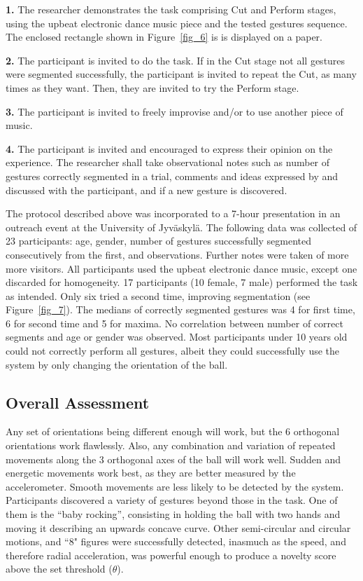 \documentclass{nime-alternate_ADJ} %
\begin{document}
\textbf{1.}	The researcher demonstrates the task comprising Cut and Perform stages, using the upbeat electronic dance music piece and the tested gestures sequence. The enclosed rectangle shown in Figure~\ref{fig_6} is is displayed on a paper.

\textbf{2.}	The participant is invited to do the task. If in the Cut stage not all gestures were segmented successfully, the participant is invited to repeat the Cut, as many times as they want. Then, they are invited to try the Perform stage.

\textbf{3.}	The participant is invited to freely improvise and/or to use another piece of music.

\textbf{4.}	The participant is invited and encouraged to express their opinion on the experience. The researcher shall take observational notes such as number of gestures correctly segmented in a trial, comments and ideas expressed by and discussed with the participant, and if a new gesture is discovered.

The protocol described above was incorporated to a 7-hour presentation in an outreach event at the 
University of Jyväskylä. The following data was collected of 23 participants: age, gender, number of gestures successfully segmented consecutively from the first, and observations. Further  notes were taken of more more visitors. All participants used the upbeat electronic dance music, except one  discarded for homogeneity. 17 participants (10 female, 7 male) performed the task as intended. Only six tried a second time, improving segmentation (see Figure~\ref{fig_7}). The medians of correctly segmented gestures was 4 for first time, 6 for second time and 5 for maxima. No correlation between number of correct segments and age or gender was observed. Most participants under 10 years old could not correctly perform all gestures, albeit they could successfully use the system by only changing the orientation of the ball.

\subsection{Overall Assessment}

Any set of orientations being different enough will work, but the 6 orthogonal orientations work flawlessly. Also, any combination and variation of repeated movements along the 3 orthogonal axes of the ball will work well. Sudden and energetic movements work best, as they are better measured by the accelerometer. Smooth movements are less likely to be detected by the system. Participants discovered a variety of gestures beyond those in the task. One of them is the “baby rocking”, consisting in holding the ball with two hands and moving it describing an upwards concave curve. Other semi-circular and circular motions, and ``8" figures were successfully detected, inasmuch as the speed, and therefore radial acceleration, was powerful enough to produce a novelty score above the set threshold ($\theta $).
\end{document}
